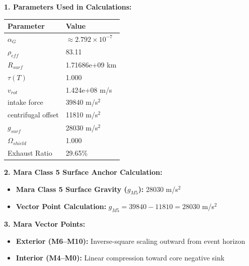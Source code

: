 \documentclass[11pt, a4paper]{article}
\begin{document}
\vspace{0.5em}
\noindent \textbf{1. Parameters Used in Calculations:}
\begin{center}
  \begin{tabular}{|l|l|}
    \hline
    \textbf{Parameter} & \textbf{Value} \\ \hline
    $\alpha_G$ & $\approx 2.792 \times 10^{-7}$ \\ \hline
    $\rho_{eff}$ & 83.11 \\ \hline
    $R_{surf}$ & 1.71686e+09 km \\ \hline
    $\tau(T)$ & 1.000 \\ \hline
    $v_{rot}$ & 1.424e+08 m/s \\ \hline
    intake force & 39840 m/s$^2$ \\ \hline
    centrifugal offset & 11810 m/s$^2$ \\ \hline
    $g_{surf}$ & 28030 m/s$^2$ \\ \hline
    $\Omega_{shield}$ & 1.000 \\ \hline
    Exhaust Ratio & 29.65\% \\ \hline
  \end{tabular}
\end{center}

\vspace{0.5em}
\noindent \textbf{2. Mara Class 5 Surface Anchor Calculation:}
\begin{itemize}
  \item \textbf{Mara Class 5 Surface Gravity ($g_{M5}$):} 28030 m/s$^2$
  \item \textbf{Vector Point Calculation:} $g_{M5} = 39840 - 11810 = 28030$ m/s$^2$
\end{itemize}

\vspace{0.5em}
\noindent \textbf{3. Mara Vector Points:}
\begin{itemize}
  \item \textbf{Exterior (M6--M10):} Inverse-square scaling outward from event horizon
  \item \textbf{Interior (M4--M0):} Linear compression toward core negative sink
\end{itemize}
\end{document}
